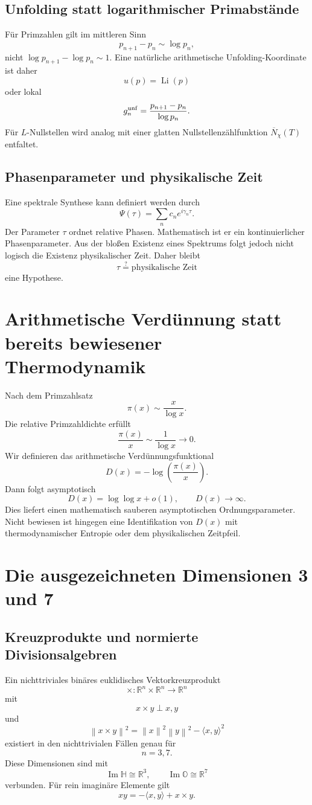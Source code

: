 \documentclass[11pt,a4paper]{article}
\newcommand{\OO}{\mathbb O}
\newcommand{\HH}{\mathbb H}
\newcommand{\RR}{\mathbb R}
\newcommand{\norm}[1]{\left\lVert #1 \right\rVert}
\begin{document}
\subsection{Unfolding statt logarithmischer Primabstände}
Für Primzahlen gilt im mittleren Sinn
\[
p_{n+1}-p_n\sim\log p_n,
\]
nicht $\log p_{n+1}-\log p_n\sim1$. Eine natürliche arithmetische Unfolding-Koordinate ist daher
\[
u(p)=\operatorname{Li}(p)
\]
oder lokal
\[
g_n^{\rm unf}=\frac{p_{n+1}-p_n}{\log p_n}.
\]
Für $L$-Nullstellen wird analog mit einer glatten Nullstellenzählfunktion $\overline N_\chi(T)$ entfaltet.

\subsection{Phasenparameter und physikalische Zeit}
Eine spektrale Synthese kann definiert werden durch
\[
\Psi(\tau)=\sum_n c_ne^{i\gamma_n\tau}.
\]
Der Parameter $\tau$ ordnet relative Phasen. Mathematisch ist er ein kontinuierlicher Phasenparameter. Aus der bloßen Existenz eines Spektrums folgt jedoch nicht logisch die Existenz physikalischer Zeit. Daher bleibt
\[
\boxed{\tau\stackrel{?}{=}\text{physikalische Zeit}}
\]
eine Hypothese.

\section{Arithmetische Verdünnung statt bereits bewiesener Thermodynamik}
Nach dem Primzahlsatz
\[
\pi(x)\sim\frac{x}{\log x}.
\]
Die relative Primzahldichte erfüllt
\[
\frac{\pi(x)}x\sim\frac1{\log x}\to0.
\]
Wir definieren das arithmetische Verdünnungsfunktional
\[
\boxed{D(x)=-\log\left(\frac{\pi(x)}x\right).}
\]
Dann folgt asymptotisch
\[
D(x)=\log\log x+o(1),\qquad D(x)\to\infty.
\]
Dies liefert einen mathematisch sauberen asymptotischen Ordnungsparameter. Nicht bewiesen ist hingegen eine Identifikation von $D(x)$ mit thermodynamischer Entropie oder dem physikalischen Zeitpfeil.

\section{Die ausgezeichneten Dimensionen 3 und 7}
\subsection{Kreuzprodukte und normierte Divisionsalgebren}
Ein nichttriviales binäres euklidisches Vektorkreuzprodukt
\[
\times:\RR^n\times\RR^n\to\RR^n
\]
mit
\[
x\times y\perp x,y
\]
und
\[
\norm{x\times y}^2=\norm{x}^2\norm{y}^2-\langle x,y\rangle^2
\]
existiert in den nichttrivialen Fällen genau für
\[
\boxed{n=3,7.}
\]
Diese Dimensionen sind mit
\[
\operatorname{Im}\HH\cong\RR^3,\qquad \operatorname{Im}\OO\cong\RR^7
\]
verbunden. Für rein imaginäre Elemente gilt
\[
xy=-\langle x,y\rangle+x\times y.
\]
\end{document}

